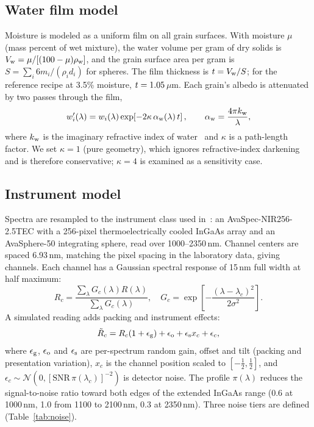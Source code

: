 \documentclass[10pt,twocolumn,letterpaper]{article}
\newcommand{\um}{\,$\mu$m}
\begin{document}
\subsection{Water film model}

Moisture is modeled as a uniform film on all grain surfaces. With moisture $\mu$ (mass percent of wet mixture), the water volume per gram of dry solids is $V_{\rm w}=\mu/[(100-\mu)\rho_{\rm w}]$, and the grain surface area per gram is $S=\sum_i 6m_i/(\rho_i d_i)$ for spheres. The film thickness is $t=V_{\rm w}/S$; for the reference recipe at 3.5\% moisture, $t=1.05$\um. Each grain's albedo is attenuated by two passes through the film,
\begin{equation}
w_i'(\lambda)=w_i(\lambda)\exp\!\left[-2\kappa\,\alpha_{\rm w}(\lambda)\,t\right],\qquad \alpha_{\rm w}=\frac{4\pi k_{\rm w}}{\lambda},
\end{equation}
where $k_{\rm w}$ is the imaginary refractive index of water~\cite{segelstein1981} and $\kappa$ is a path-length factor. We set $\kappa=1$ (pure geometry), which ignores refractive-index darkening~\cite{lekner1988} and is therefore conservative; $\kappa=4$ is examined as a sensitivity case.

\subsection{Instrument model}

Spectra are resampled to the instrument class used in~\cite{kuubata2025}: an AvaSpec-NIR256-2.5TEC with a 256-pixel thermoelectrically cooled InGaAs array and an AvaSphere-50 integrating sphere, read over 1000--2350\,nm. Channel centers are spaced 6.93\,nm, matching the pixel spacing in the laboratory data, giving \nInst{} channels. Each channel has a Gaussian spectral response of 15\,nm full width at half maximum:
\begin{equation}
R_c=\frac{\sum_\lambda G_c(\lambda)R(\lambda)}{\sum_\lambda G_c(\lambda)},\quad G_c=\exp\!\left[-\frac{(\lambda-\lambda_c)^2}{2\sigma^2}\right].
\end{equation}
A simulated reading adds packing and instrument effects:
\begin{equation}
\tilde R_c=R_c(1+\epsilon_{\rm g})+\epsilon_{\rm o}+\epsilon_{\rm s}x_c+\epsilon_c,\label{eq:noise}
\end{equation}
where $\epsilon_{\rm g}$, $\epsilon_{\rm o}$ and $\epsilon_{\rm s}$ are per-spectrum random gain, offset and tilt (packing and presentation variation), $x_c$ is the channel position scaled to $[-\tfrac12,\tfrac12]$, and $\epsilon_c\sim\mathcal N\!\left(0,[\mathrm{SNR}\,\pi(\lambda_c)]^{-2}\right)$ is detector noise. The profile $\pi(\lambda)$ reduces the signal-to-noise ratio toward both edges of the extended InGaAs range (0.6 at 1000\,nm, 1.0 from 1100 to 2100\,nm, 0.3 at 2350\,nm). Three noise tiers are defined (Table~\ref{tab:noise}).
\end{document}
